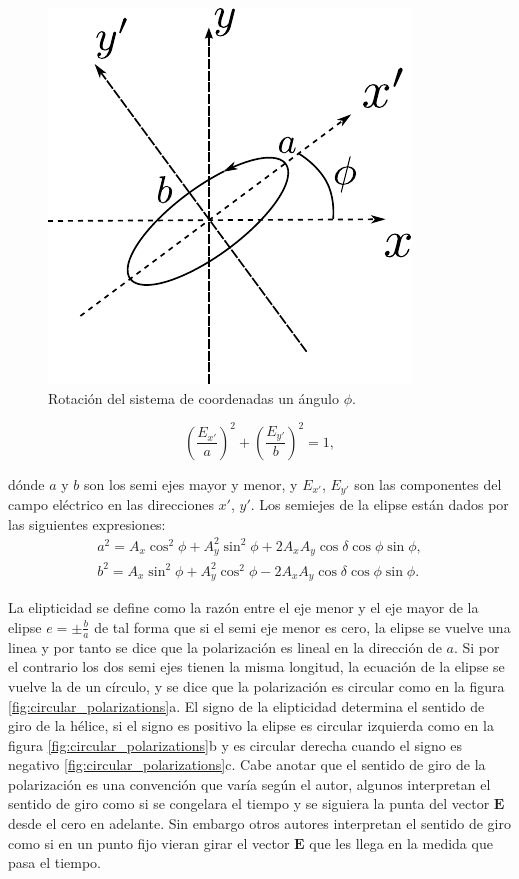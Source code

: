 \begin{figure}[h!]
\centering
\includegraphics[scale = 1]{ellipse}
\caption[Rotación del sistema de coordenadas de la elipse de polarización]{Rotación del sistema de coordenadas un ángulo $\phi$.}
\label{fig:ellipse}
\end{figure}

\begin{equation}
\left(\frac{E_{x'}}{a}\right)^2+\left(\frac{E_{y'}}{b}\right)^2 = 1,
\label{eq:new_ellipse}
\end{equation}

dónde $a$ y $b$ son los semi ejes mayor y menor, y $E_{x'}$, $E_{y'}$
son las componentes del campo eléctrico en las direcciones $x'$,
$y'$. Los semiejes de la elipse están dados por las siguientes expresiones:
\begin{align*}
a^2 = A_x\cos^2{\phi}+A_y^2\sin^2{\phi} +2A_xA_y \cos{\delta}\cos{\phi}\sin{\phi},\\
b^2 = A_x\sin^2{\phi}+A_y^2\cos^2{\phi} -2A_xA_y \cos{\delta}\cos{\phi}\sin{\phi}.
\end{align*}

La elipticidad se define como la razón entre el eje menor y el eje
mayor de la elipse $e=\pm\frac{b}{a}$ de tal forma que si el semi eje
menor es cero, la elipse se vuelve una linea y por tanto se dice que
la polarización es lineal en la dirección de $a$. Si por el contrario
los dos semi ejes tienen  la misma longitud, la ecuación de la elipse
se vuelve la de un círculo, y se dice que la polarización es
circular como en la figura \ref{fig:circular_polarizations}a. 
El signo de la elipticidad determina el sentido
de giro de la hélice, si el signo es positivo la elipse es circular
izquierda como en la figura \ref{fig:circular_polarizations}b y es circular derecha
cuando el signo es negativo \ref{fig:circular_polarizations}c. Cabe
anotar que el sentido de giro de la polarización es una convención
que varía según el autor, algunos interpretan el sentido de giro como
si se congelara el tiempo y se siguiera la punta del vector
$\mathbf{E}$ desde el cero en adelante. Sin embargo otros autores
interpretan el sentido de giro como si en un punto fijo vieran girar
el vector $\mathbf{E}$ que les llega en la medida que pasa el tiempo. 

